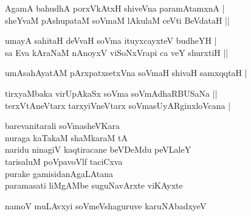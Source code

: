 \begin{entry}
\begin{shl}
AgamA bahudhA porxVkAtxH shiveVna paramAtamxnA |\\
sheYvaM pAshupataM soVmaM lAkulaM ceVti BeVdataH ||
\end{shl}
\begin{shl}
umayA sahitaH deVvaH soVma ituyxcayxteV budheYH |\\
sa Eva kAraNaM nAnoyxV viSoNxVrapi ca veY shurxtiH ||
\end{shl}
\begin{shl}
umAsahAyatAM pArxpatxsetxVna soVmaH shivaH samxqqtaH |
\end{shl}
\begin{shl}
tirxyaMbaka virUpAkaSx soVma soVmAdhaRBUSaNa ||\\
terxVtAneVtarx tarxyiVneVtarx soVmasUyARginxloVcana |
\end{shl}
\end{entry}

\begin{entry}
\gl{}
\begin{shl}
barevanitarali soVmasheVKara\\
nuraga kaTakaM shaMkaraM tA\\
naridu ninagiV kaqtiracane beVDeMdu peVLaleY\\
tarisaluM poVpavoVlf taciCxva\\
purake gamisidanAgaLAtana\\
paramasati liMgAMbe suguNavArxte viKAyxte
\end{shl}
\end{entry}

\begin{entry}
\gl{}
\begin{shl}
namoV muLAvxyi soVmeVshaguruve karuNAbadxyeV
\end{shl}
\end{entry}

